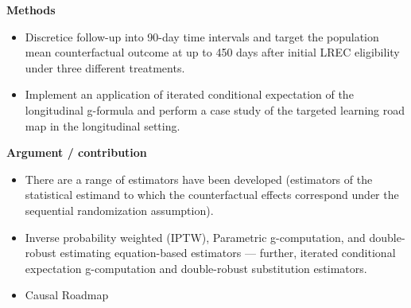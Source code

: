 \documentclass[
]{book}
\providecommand{\tightlist}{%
  \setlength{\itemsep}{0pt}\setlength{\parskip}{0pt}}
\begin{document}
\textbf{Methods}

\begin{itemize}
\tightlist
\item
  Discretice follow-up into 90-day time intervals and target the population mean counterfactual outcome at up to 450 days after initial LREC eligibility under three different treatments.
\item
  Implement an application of iterated conditional expectation of the longitudinal g-formula and perform a case study of the targeted learning road map in the longitudinal setting.
\end{itemize}

\textbf{Argument / contribution}

\begin{itemize}
\tightlist
\item
  There are a range of estimators have been developed (estimators of the statistical estimand to which the counterfactual effects correspond under the sequential randomization assumption).
\item
  Inverse probability weighted (IPTW), Parametric g-computation, and double-robust estimating equation-based estimators --- further, iterated conditional expectation g-computation and double-robust substitution estimators.
\item
  Causal Roadmap


\end{itemize}
\end{document}
